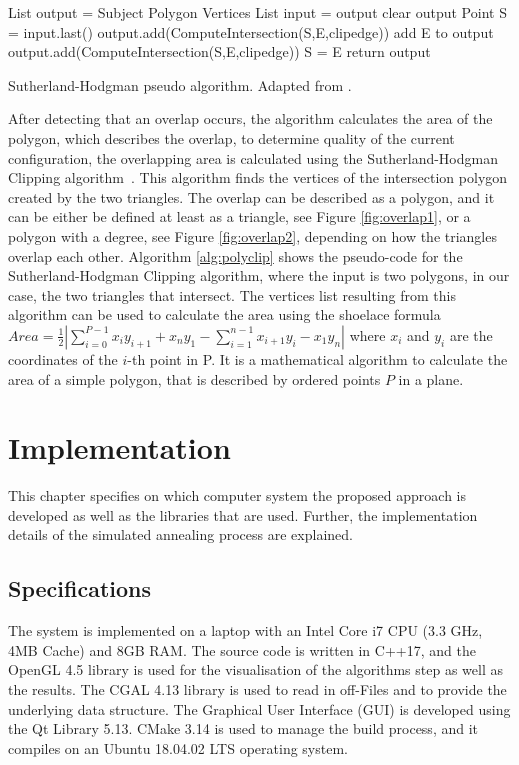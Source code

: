 \documentclass[draft,final]{vutinfth} %
\begin{document}
\begin{algorithm}
List output = Subject Polygon Vertices\;
{
List input = output\;
clear output\;
Point S = input.last()\;
{
{
{
output.add(ComputeIntersection(S,E,clipedge))\;
}
add E to output\;
}
{
{
output.add(ComputeIntersection(S,E,clipedge))\;
}
S = E\;
}
}
}
return output\;
\caption{Sutherland-Hodgman pseudo algorithm. Adapted from \cite{wiki:polygonclip}.}
\label{alg:polyclip}
\end{algorithm}

After detecting that an overlap occurs, the algorithm calculates the area of the polygon, which describes the overlap, to determine quality of the current configuration, the overlapping area is calculated using the Sutherland-Hodgman Clipping algorithm~\cite{sutherland1974reentrant}. This algorithm finds the vertices of the intersection polygon created by the two triangles. The overlap can be described as a polygon, and it can be either be defined at least as a triangle, see Figure \ref{fig:overlap1}, or a polygon with a degree, see Figure \ref{fig:overlap2}, depending on how the triangles overlap each other. Algorithm \ref{alg:polyclip} shows the pseudo-code for the Sutherland-Hodgman Clipping algorithm, where the input is two polygons, in our case, the two triangles that intersect. The vertices list resulting from this algorithm can be used to calculate the area using the shoelace formula~\cite{vslapak2017automated} $Area = \frac{1}{2} \left| \sum_{i=0}^{P-1} x_iy_{i+1} + x_ny_1 - \sum_{i=1}^{n-1} x_{i+1}y_i - x_1y_n \right|$ where $x_i$ and $y_i$ are the coordinates of the $i$-th point in P. It is a mathematical algorithm to calculate the area of a simple polygon, that is described by ordered points $P$ in a plane.

\chapter{Implementation}
\label{chap:Implementation}
This chapter specifies on which computer system the proposed approach is developed as well as the libraries that are used. Further, the implementation details of the simulated annealing process are explained.

\section{Specifications}
The system is implemented on a laptop with an Intel Core i7 CPU (3.3 GHz, 4MB Cache) and 8GB RAM. The source code is written in C++17, and the OpenGL 4.5 library is used for the visualisation of the algorithms step as well as the results. The CGAL 4.13 library is used to read in off-Files and to provide the underlying data structure. The Graphical User Interface (GUI) is developed using the Qt Library 5.13. CMake 3.14 is used to manage the build process, and it compiles on an Ubuntu 18.04.02 LTS operating system.
\end{document}
